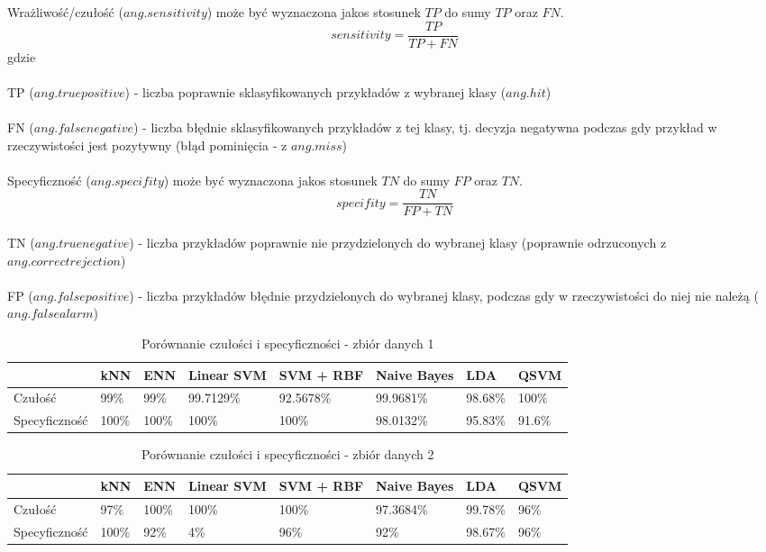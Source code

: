 \documentclass[[10pt,a4paper]{article}
\begin{document}
Wrażliwość/czułość ($ang. sensitivity$) może być wyznaczona jakos stosunek $TP$ do sumy $TP$ oraz $FN$.
 $$
sensitivity = \frac{TP}{TP + FN}
$$
gdzie\\
\\
TP ($ang. true positive$) - liczba poprawnie sklasyfikowanych przykładów z wybranej klasy ($ang. hit$)\\
\\
FN ($ang. false negative$) - liczba błędnie sklasyfikowanych przykładów z tej klasy, tj. decyzja negatywna podczas gdy przykład w rzeczywistości jest pozytywny (błąd pominięcia - z $ang. miss$)\\
\\
Specyficzność ($ang. specifity$) może być wyznaczona jakos stosunek $TN$ do sumy $FP$ oraz $TN$.\\
 $$
specifity = \frac{TN}{FP + TN}
$$
\\
TN ($ang. true negative$) - liczba przykładów poprawnie nie przydzielonych do wybranej klasy (poprawnie odrzuconych z $ang. correct rejection$)\\
\\
FP ($ang. false positive$) - liczba przykładów błędnie przydzielonych do wybranej klasy, podczas gdy w rzeczywistości do niej nie należą ($ang. false alarm$)\\



\begin{table}[h]
\centering
\caption{Porównanie czułości i specyficzności - zbiór danych 1}
\label{sens2}
\begin{tabular}{|l|l|l|l|l|l|l|l|}
\hline
              & kNN & ENN & Linear SVM & SVM + RBF & Naive Bayes & LDA &QSVM\\ \hline
Czułość       &  99\%   &  99\%   &    99.7129\%        &     92.5678\%       &   99.9681\%   & 98.68\%      & 100\% \\ \hline
Specyficzność &  100\%   &  100\%   &     100\%       &      100\%     &   98.0132\%     & 95.83\% & 91.6\%    \\ \hline
\end{tabular}
\end{table}

\begin{table}[h]
\centering
\caption{Porównanie czułości i specyficzności - zbiór danych 2}
\label{sens1}
\begin{tabular}{|l|l|l|l|l|l|l|l|}
\hline
              & kNN & ENN & Linear SVM & SVM + RBF & Naive Bayes & LDA & QSVM\\ \hline
Czułość       &  97\%  & 100\%  &    100\%    &    100\%   &      97.3684\% & 99.78\%  & 96\%   \\ \hline
Specyficzność &   100\%   &  92\%   &     4\%       &     96\%   &       92\%  & 98.67\%  &96\%  \\ \hline
\end{tabular}
\end{table}
\end{document}
